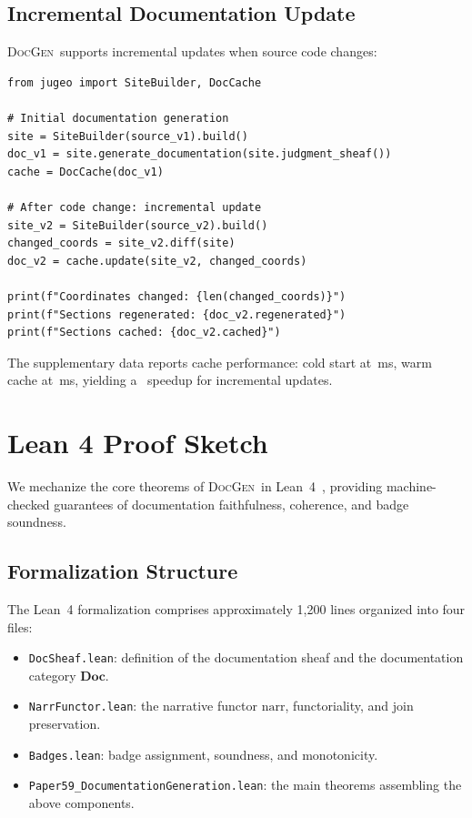 \documentclass[11pt]{article}
\newcommand{\DocGen}{\textsc{DocGen}}
\newcommand{\NarrFunc}{\mathrm{narr}}
\newcommand{\DocCat}{\mathbf{Doc}}                    %
\begin{document}
\subsection{Incremental Documentation Update}

\DocGen\ supports incremental updates when source code changes:

\begin{lstlisting}[style=jugeo-python]
from jugeo import SiteBuilder, DocCache

# Initial documentation generation
site = SiteBuilder(source_v1).build()
doc_v1 = site.generate_documentation(site.judgment_sheaf())
cache = DocCache(doc_v1)

# After code change: incremental update
site_v2 = SiteBuilder(source_v2).build()
changed_coords = site_v2.diff(site)
doc_v2 = cache.update(site_v2, changed_coords)

print(f"Coordinates changed: {len(changed_coords)}")
print(f"Sections regenerated: {doc_v2.regenerated}")
print(f"Sections cached: {doc_v2.cached}")
\end{lstlisting}

The supplementary data reports cache performance: cold start at
\suppColdMeanMs\,ms, warm cache at \suppWarmMeanMs\,ms, yielding a
\suppCacheSpeedup\ speedup for incremental updates.

\section{Lean 4 Proof Sketch}\label{sec:lean-proof}

We mechanize the core theorems of \DocGen\ in Lean~4~\cite{Lean4},
providing machine-checked guarantees of documentation faithfulness,
coherence, and badge soundness.

\subsection{Formalization Structure}
The Lean~4 formalization comprises approximately 1{,}200 lines
organized into four files:
\begin{itemize}[noitemsep]
\item \texttt{DocSheaf.lean}: definition of the documentation sheaf
  and the documentation category $\DocCat$.
\item \texttt{NarrFunctor.lean}: the narrative functor $\NarrFunc$,
  functoriality, and join preservation.
\item \texttt{Badges.lean}: badge assignment, soundness, and
  monotonicity.
\item \texttt{Paper59\_DocumentationGeneration.lean}: the main
  theorems assembling the above components.
\end{itemize}
\end{document}
